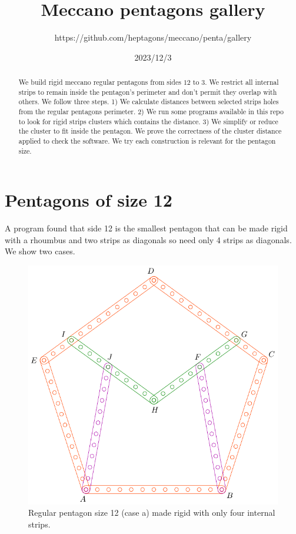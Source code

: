 \documentclass[11pt]{article}
\title{Meccano pentagons gallery}
\author{https://github.com/heptagons/meccano/penta/gallery}
\date{2023/12/3}
\begin{document}
\maketitle
\begin{abstract}
We build rigid meccano regular pentagons from sides $12$ to $3$. We restrict all internal strips to remain inside the pentagon's perimeter and don't permit they overlap with others. We follow three steps. 1) We calculate distances between selected strips holes from the regular pentagons perimeter. 2) We run some programs available in this repo to look for rigid strips clusters which contains the distance. 3) We simplify or reduce the cluster to fit inside the pentagon. We prove the correctness of the cluster distance applied to check the software. We try each construction is relevant for the pentagon size.
\end{abstract}

\section{Pentagons of size 12}

A program found that side 12 is the smallest pentagon that can be made rigid with a rhoumbus and two strips as diagonals so need only 4 strips as diagonals. We show two cases.

\begin{figure}[h]
 \centering
 \includegraphics[scale=1]{12/penta12a}
 \caption{Regular pentagon size 12 (case a) made rigid with only four internal strips.}
 \label{fig:penta12a}
\end{figure}
\end{document}
